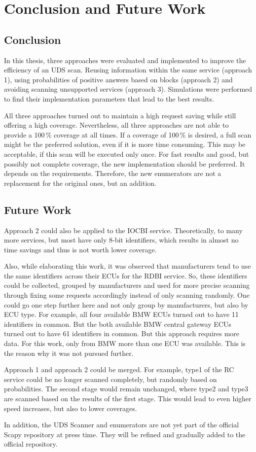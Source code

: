 \chapter{Conclusion and Future Work}

\section{Conclusion}

In this thesis, three approaches were evaluated and implemented to improve the efficiency of an UDS scan. Reusing information within the same service (approach 1), using probabilities of positive answers based on blocks (approach 2) and avoiding scanning unsupported services (approach 3). Simulations were performed to find their implementation parameters that lead to the best results.

All three approaches turned out to maintain a high request saving while still offering a high coverage.
Nevertheless, all three approaches are not able to provide a 100\,\% coverage at all times. 
If a coverage of 100\,\% is desired, a full scan might be the preferred solution, even if it is more time consuming. This may be acceptable, if this scan will be executed only once. For fast results and good, but possibly not complete coverage, the new implementation should be preferred. It depends on the requirements. Therefore, the new enumerators are not a replacement for the original ones, but an addition.

\section{Future Work}

Approach 2 could also be applied to the IOCBI service. Theoretically, to many more services, but most have only 8-bit identifiers, which results in almost no time savings and thus is not worth lower coverage.

Also, while elaborating this work, it was observed that manufacturers tend to use the same identifiers across their ECUs for the RDBI service. So, these identifiers could be collected, grouped by manufacturers and used for more precise scanning through fixing some requests accordingly instead of only scanning randomly. One could go one step further here and not only group by manufacturers, but also by ECU type.
For example, all four available BMW ECUs turned out to have 11 identifiers in common. But the both available BMW central gateway ECUs turned out to have 61 identifiers in common. But this approach requires more data. For this work, only from BMW more than one ECU was available. This is the reason why it was not pursued further.

Approach 1 and approach 2 could be merged. For example, type1 of the RC service could be no longer scanned completely, but randomly based on probabilities. The second stage would remain unchanged, where type2 and type3 are scanned based on the results of the first stage. This would lead to even higher speed increases, but also to lower coverages.

In addition, the UDS Scanner and enumerators are not yet part of the official Scapy repository at press time. They will be refined and gradually added to the official repository.
